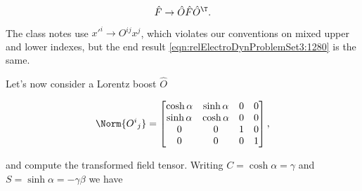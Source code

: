 \begin{equation}\label{eqn:relElectroDynProblemSet3:1280}
\hat{F} \rightarrow \hat{O} \hat{F} \hat{O}^\T.
\end{equation}

The class notes use ${x'}^i \rightarrow O^{ij} x^j$, which violates our conventions on mixed upper and lower indexes, but the end result \ref{eqn:relElectroDynProblemSet3:1280} is the same.

Let's now consider a Lorentz boost $\hat{O}$ 

\begin{equation}\label{eqn:relElectroDynProblemSet3:1300}
\Norm{{O^i}_j} =
\begin{bmatrix}
\cosh\alpha & \sinh\alpha & 0 & 0 \\
\sinh\alpha & \cosh\alpha & 0 & 0 \\
0 & 0 & 1 & 0 \\
0 & 0 & 0 & 1
\end{bmatrix},
\end{equation}

and compute the transformed field tensor.  Writing $C = \cosh\alpha = \gamma$ and $S = \sinh\alpha = -\gamma \beta$ we have

